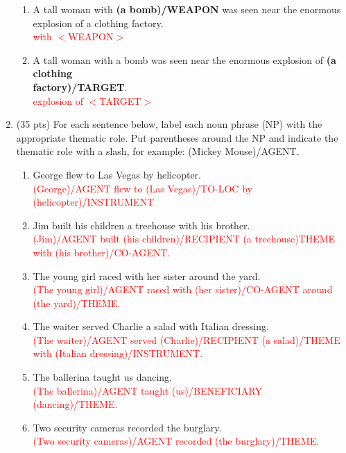 \documentclass[11pt]{article}
\begin{document}
\begin{enumerate}
\begin{enumerate}
\item A tall woman with {\bf (a bomb)/WEAPON} was seen near the
  enormous explosion of a clothing  factory. \\
\textcolor{red}{with $<$WEAPON$>$}

\item A tall woman with a bomb was seen near the enormous explosion of {\bf (a
    clothing \\ factory)/TARGET}. \\
\textcolor{red}{explosion of $<$TARGET$>$}

\end{enumerate}



\newpage

\item (35 pts) For each sentence below, label each noun phrase (NP)
  with the appropriate thematic role. Put parentheses around the NP
  and indicate the thematic role with a slash, for example: (Mickey
  Mouse)/AGENT.

\begin{enumerate}

\item George flew to Las Vegas by helicopter.\\
\textcolor{red}{(George)/AGENT flew to (Las Vegas)/TO-LOC by (helicopter)/INSTRUMENT}
\item Jim built his children a treehouse with his brother. \\
\textcolor{red}{(Jim)/AGENT built (his children)/RECIPIENT (a treehouse)THEME with (his brother)/CO-AGENT.}
\item The young girl raced with her sister around the yard. \\
\textcolor{red}{(The young girl)/AGENT raced with (her sister)/CO-AGENT around (the yard)/THEME.}

\item The waiter served Charlie a salad with Italian dressing.\\
\textcolor{red}{(The waiter)/AGENT served (Charlie)/RECIPIENT (a salad)/THEME with (Italian dressing)/INSTRUMENT.}

\item The ballerina taught us dancing.\\
\textcolor{red}{(The ballerina)/AGENT taught (us)/BENEFICIARY (dancing)/THEME.}

\item Two security cameras recorded the burglary. \\
\textcolor{red}{(Two security cameras)/AGENT recorded (the burglary)/THEME.}


\end{enumerate}
\end{enumerate}
\end{document}
